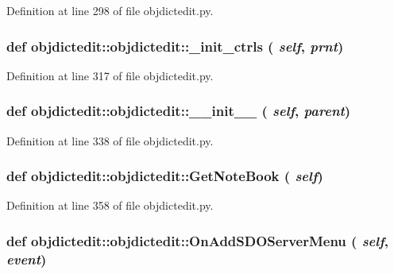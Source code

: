 Definition at line 298 of file objdictedit.py.\hypertarget{classobjdictedit_1_1objdictedit_1e885afd5e31d2c6be0a0e70a79b417f}{
\subsubsection[\_\-init\_\-ctrls]{\setlength{\rightskip}{0pt plus 5cm}def objdictedit::objdictedit::\_\-init\_\-ctrls ( {\em self},  {\em prnt})}}
\label{classobjdictedit_1_1objdictedit_1e885afd5e31d2c6be0a0e70a79b417f}




Definition at line 317 of file objdictedit.py.\hypertarget{classobjdictedit_1_1objdictedit_4abb1c197354d05c25e9ca9e0ad49f66}{
\subsubsection[\_\-\_\-init\_\-\_\-]{\setlength{\rightskip}{0pt plus 5cm}def objdictedit::objdictedit::\_\-\_\-init\_\-\_\- ( {\em self},  {\em parent})}}
\label{classobjdictedit_1_1objdictedit_4abb1c197354d05c25e9ca9e0ad49f66}




Definition at line 338 of file objdictedit.py.\hypertarget{classobjdictedit_1_1objdictedit_38ba116f55e22e5b8e2504c44b1c9722}{
\subsubsection[GetNoteBook]{\setlength{\rightskip}{0pt plus 5cm}def objdictedit::objdictedit::Get\-Note\-Book ( {\em self})}}
\label{classobjdictedit_1_1objdictedit_38ba116f55e22e5b8e2504c44b1c9722}




Definition at line 358 of file objdictedit.py.\hypertarget{classobjdictedit_1_1objdictedit_2d25a6a40a74e893aebce26405a0d8f7}{
\subsubsection[OnAddSDOServerMenu]{\setlength{\rightskip}{0pt plus 5cm}def objdictedit::objdictedit::On\-Add\-SDOServer\-Menu ( {\em self},  {\em event})}}
\label{classobjdictedit_1_1objdictedit_2d25a6a40a74e893aebce26405a0d8f7}





